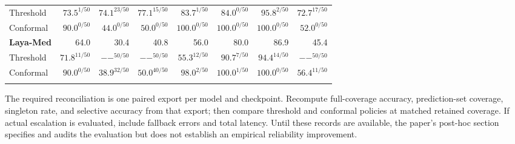 \begin{table}[p]
\begin{tabular*}{\linewidth}{@{\extracolsep{\fill}}lrrrrrrr@{}}
\quad Threshold & $73.5^{1/50}$ & $74.1^{23/50}$ & $77.1^{15/50}$ & $83.7^{1/50}$ & $84.0^{0/50}$ & $95.8^{2/50}$ & $72.7^{17/50}$\\
\quad Conformal & $90.0^{0/50}$ & $44.0^{0/50}$ & $50.0^{0/50}$ & $100.0^{0/50}$ & $100.0^{0/50}$ & $100.0^{0/50}$ & $52.0^{0/50}$\\
\addlinespace[4pt]
\textbf{Laya-Med} & 64.0 & 30.4 & 40.8 & 56.0 & 80.0 & 86.9 & 45.4\\
\quad Threshold & $71.8^{11/50}$ & $--^{50/50}$ & $--^{50/50}$ & $55.3^{12/50}$ & $90.7^{7/50}$ & $94.4^{14/50}$ & $--^{50/50}$\\
\quad Conformal & $90.0^{0/50}$ & $38.9^{32/50}$ & $50.0^{40/50}$ & $98.0^{2/50}$ & $100.0^{1/50}$ & $100.0^{0/50}$ & $56.4^{11/50}$\\
\addlinespace[4pt]
\bottomrule
\end{tabular*}
\end{table}


The required reconciliation is one paired export per model and checkpoint. Recompute full-coverage accuracy, prediction-set coverage, singleton rate, and selective accuracy from that export; then compare threshold and conformal policies at matched retained coverage. If actual escalation is evaluated, include fallback errors and total latency. Until these records are available, the paper's post-hoc section specifies and audits the evaluation but does not establish an empirical reliability improvement.
